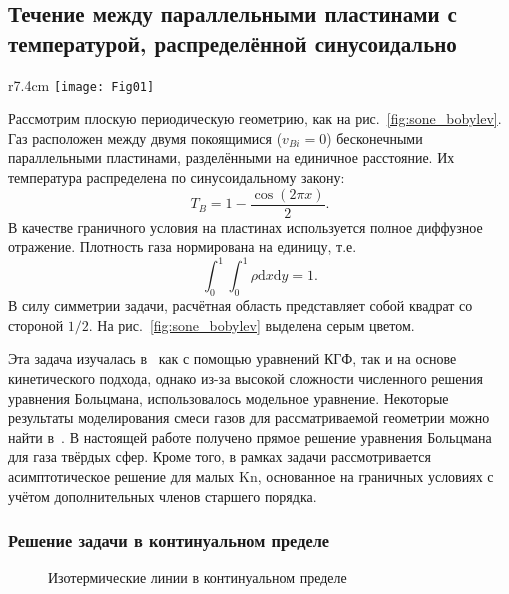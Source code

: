 \documentclass[
aps,%
12pt,%
final,%
notitlepage,%
oneside,%
onecolumn,%
nobibnotes,%
nofootinbib,%
superscriptaddress,%
noshowpacs,%
showkeys,%
floatfix,%
tightenlines,%
centertags]%
{revtex4}
\newcommand{\Kn}{\mathrm{Kn}}
\newcommand{\dd}{\mathrm{d}}
\begin{document}
\subsection{Течение между параллельными пластинами с температурой, распределённой синусоидально}

\begin{wrapfigure}{r}{7.4cm}
    \vspace{-10pt}
    \centering
    \texttt{[image: Fig01]}
    \vspace{-20pt}
    \caption{Геометрия задачи}\label{fig:sone_bobylev}
    \vspace{20pt}
\end{wrapfigure}

Рассмотрим плоскую периодическую геометрию, как на рис.~\ref{fig:sone_bobylev}.
Газ расположен между двумя покоящимися (\(v_{Bi} = 0\)) бесконечными параллельными пластинами,
разделёнными на единичное расстояние. Их температура распределена по синусоидальному закону:
\begin{equation}
    T_B = 1 - \frac{\cos(2\pi x)}{2}.
\end{equation}
В качестве граничного условия на пластинах используется полное диффузное отражение.
Плотность газа нормирована на единицу, т.е.
\begin{equation}\label{eq:total_mass}
    \int_0^1\int_0^1\rho\dd{x}\dd{y} = 1.
\end{equation}
В силу симметрии задачи, расчётная область представляет собой квадрат со стороной \(1/2\).
На рис.~\ref{fig:sone_bobylev} выделена серым цветом.

Эта задача изучалась в~\cite{Sone1996} как с помощью уравнений КГФ, так и на основе кинетического подхода,
однако из-за высокой сложности численного решения уравнения Больцмана, использовалось модельное уравнение.
Некоторые результаты моделирования смеси газов для рассматриваемой геометрии можно найти в~\cite{Wu2015}.
В настоящей работе получено прямое решение уравнения Больцмана для газа твёрдых сфер.
Кроме того, в рамках задачи рассмотривается асимптотическое решение для малых \(\Kn\),
основанное на граничных условиях с учётом дополнительных членов старшего порядка.

\subsubsection{Решение задачи в континуальном пределе}

\begin{figure}
    \centering
    \caption{Изотермические линии в континуальном пределе}
    \label{fig:continuum:temp}
\end{figure}
\end{document}
